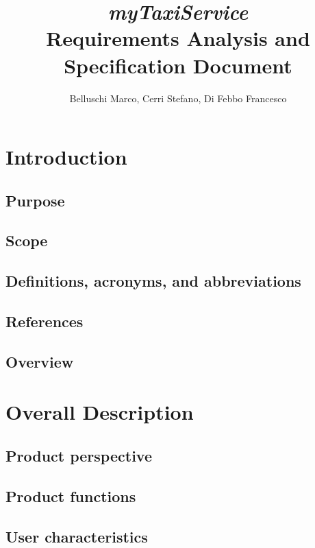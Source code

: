 \documentclass[]{report}
\title{{\Huge\textit{myTaxiService}}\\{\Large Requirements Analysis and Specification Document}}
\author{Belluschi Marco, Cerri Stefano, Di Febbo Francesco}
\begin{document}
\maketitle
\tableofcontents

\chapter{Introduction}

\section{Purpose}


\section{Scope}


\section{Definitions, acronyms, and abbreviations}


\section{References}


\section{Overview}


\chapter{Overall Description}

\section{Product perspective}


\section{Product functions}


\section{User characteristics}

\end{document}
